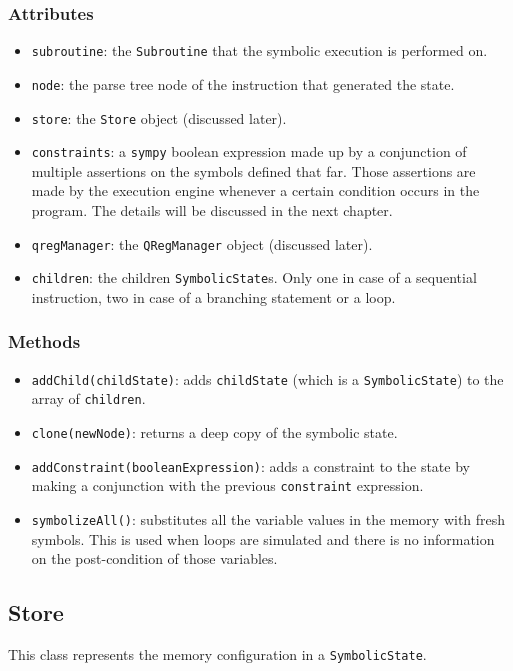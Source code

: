 \documentclass[12pt,a4paper]{report}
\theoremstyle{definition}
\theoremstyle{definition}
\theoremstyle{definition}
\begin{document}
\subsubsection{Attributes}
\begin{itemize}
    \itemsep 0em
    \item \texttt{subroutine}: the \texttt{Subroutine} that the symbolic execution is performed on.
    \item \texttt{node}: the parse tree node of the instruction that generated the state.
    \item \texttt{store}: the \texttt{Store} object (discussed later).
    \item \texttt{constraints}: a \texttt{sympy} boolean expression made up by a conjunction of multiple assertions on the symbols defined that far. Those assertions are made by the execution engine whenever a certain condition occurs in the program. The details will be discussed in the next chapter.
    \item \texttt{qregManager}: the \texttt{QRegManager} object (discussed later).
    \item \texttt{children}: the children \texttt{SymbolicState}s. Only one in case of a sequential instruction, two in case of a branching statement or a loop.
\end{itemize}
\subsubsection{Methods}
\begin{itemize}
    \itemsep 0em
    \item \texttt{addChild(childState)}: adds \texttt{childState} (which is a \texttt{SymbolicState}) to the array of \texttt{children}.
    \item \texttt{clone(newNode)}: returns a deep copy of the symbolic state.
    \item \texttt{addConstraint(booleanExpression)}: adds a constraint to the state by making a conjunction with the previous \texttt{constraint} expression.
    \item \texttt{symbolizeAll()}: substitutes all the variable values in the memory with fresh symbols. This is used when loops are simulated and there is no information on the post-condition of those variables.
\end{itemize}

\subsection{Store}
This class represents the memory configuration in a \texttt{SymbolicState}.
\end{document}
